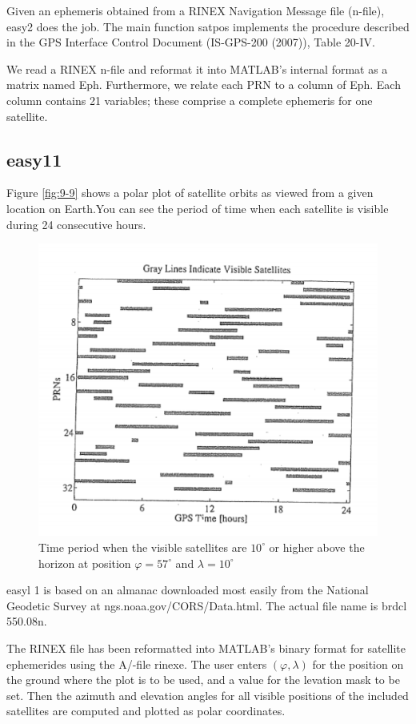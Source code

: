 		Given an ephemeris obtained from a RINEX Navigation Message file (n-file), easy2 does the job. The main function satpos implements the procedure described in the GPS Interface Control Document (IS-GPS-200 (2007)), Table 20-IV.
		
		We read a RINEX n-file and reformat it into MATLAB’s internal format as a matrix named Eph. Furthermore, we relate each PRN to a column of Eph. Each column contains 21 variables; these comprise a complete ephemeris for one satellite.
	
	\subsection{easy11}\label{subsec:easy11}
		Figure \ref{fig:9-9} shows a polar plot of satellite orbits as viewed from a given location on Earth.You can see the period of time when each satellite is visible during 24 consecutive hours.
		\begin{figure}
			\centering
			\includegraphics[width=0.7\linewidth]{TeX_files/Part03/chapter09/image/9-11}
			\caption{Time period when the visible satellites are $10^\circ$ or higher above the horizon at position $\varphi = 57^\circ$ and $\lambda = 10^\circ$}
			\label{fig:9-11}
		\end{figure}
		
		easyl 1 is based on an almanac downloaded most easily from the National Geodetic Survey at ngs.noaa.gov/CORS/Data.html. The actual file name is brdcl 550.08n.
		
		The RINEX file has been reformatted into MATLAB’s binary format for satellite ephemerides using the A/-file rinexe. The user enters $(\varphi,\lambda)$ for the position on the ground where the plot is to be used, and a value for the levation mask to be set. Then the azimuth and elevation angles for all visible positions of the included satellites are computed and plotted as polar coordinates.
		
